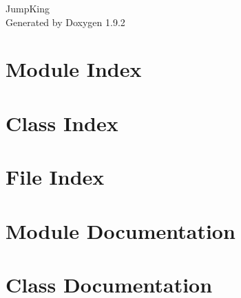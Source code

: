 \documentclass[twoside]{book}
\newcommand{\+}{\discretionary{\mbox{\scriptsize$\hookleftarrow$}}{}{}}
\newcommand{\clearemptydoublepage}{%
    \newpage{\pagestyle{empty}\cleardoublepage}%
  }
\begin{document}
  \raggedbottom
    \hypersetup{pageanchor=false,
                bookmarksnumbered=true,
                pdfencoding=unicode
               }
  \begin{titlepage}
  \vspace*{7cm}
  \begin{center}%
  {\Large Jump\+King}\\
  \vspace*{1cm}
  {\large Generated by Doxygen 1.9.2}\\
  \end{center}
  \end{titlepage}
  \clearemptydoublepage
  \tableofcontents
  \clearemptydoublepage
  \hypersetup{pageanchor=true}
\chapter{Module Index}

\chapter{Class Index}

\chapter{File Index}

\chapter{Module Documentation}









\chapter{Class Documentation}







\end{document}

